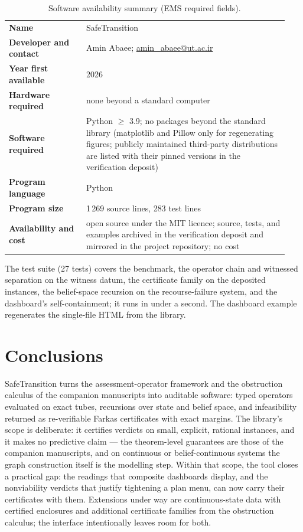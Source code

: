 \documentclass[3p,11pt]{elsarticle}
\begin{document}
\begin{table}[h]
\centering
\small
\begin{tabular}{@{}p{0.26\linewidth}p{0.68\linewidth}@{}}
\toprule
\textbf{Name} & SafeTransition \\
\textbf{Developer and contact} & Amin Abaee;
\href{mailto:amin_abaee@ut.ac.ir}{amin\_abaee@ut.ac.ir} \\
\textbf{Year first available} & 2026 \\
\textbf{Hardware required} & none beyond a standard computer \\
\textbf{Software required} & Python $\geq$ 3.9; no packages beyond the
standard library (matplotlib and Pillow only for regenerating figures;
publicly maintained third-party distributions are listed with their pinned
versions in the verification deposit) \\
\textbf{Program language} & Python \\
\textbf{Program size} & 1\,269 source lines, 283 test lines \\
\textbf{Availability and cost} & open source under the MIT licence; source,
tests, and examples archived in the verification deposit \citep{Deposit2026}
and mirrored in the project repository; no cost \\
\bottomrule
\end{tabular}
\caption{Software availability summary (EMS required fields).}
\label{tab:availability}
\end{table}

The test suite (27 tests) covers the benchmark, the operator chain and
witnessed separation on the witness datum, the certificate family on the
deposited instances, the belief-space recursion on the recourse-failure
system, and the dashboard's self-containment; it runs in under a second.
The dashboard example regenerates the single-file HTML from the library.

\section{Conclusions}\label{sec:conclusions}

SafeTransition turns the assessment-operator framework and the obstruction
calculus of the companion manuscripts into auditable software: typed
operators evaluated on exact tubes, recursions over state and belief space,
and infeasibility returned as re-verifiable Farkas certificates with exact
margins. The library's scope is deliberate: it certifies verdicts on small,
explicit, rational instances, and it makes no predictive claim --- the
theorem-level guarantees are those of the companion manuscripts, and on
continuous or belief-continuous systems the graph construction itself is
the modelling step. Within that scope, the tool closes a practical gap:
the readings that composite dashboards display, and the nonviability
verdicts that justify tightening a plan menu, can now carry their
certificates with them. Extensions under way are continuous-state data with
certified enclosures and additional certificate families from the
obstruction calculus; the interface intentionally leaves room for both.
\end{document}
